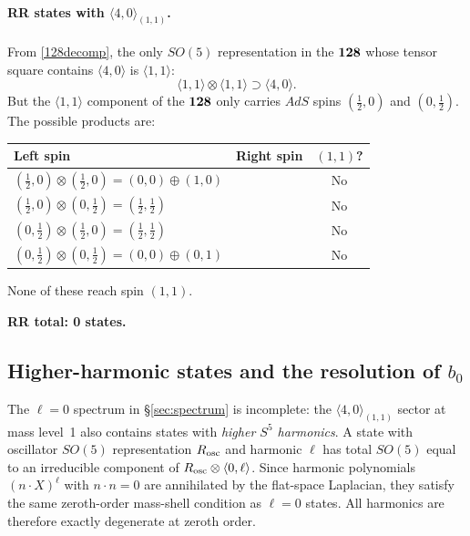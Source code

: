\documentclass[12pt]{article}
\def\be{\begin{equation}}
\def\ee{\end{equation}}
\begin{document}
\paragraph{RR states with $\langle 4,0\rangle_{(1,1)}$.}
From \eqref{128decomp}, the only $SO(5)$ representation in the ${\bf 128}$ whose tensor
square contains $\langle 4,0\rangle$ is $\langle 1,1\rangle$:
\be
\langle 1,1\rangle\otimes\langle 1,1\rangle\supset\langle 4,0\rangle.
\ee
But the $\langle 1,1\rangle$ component of the ${\bf 128}$ only carries $AdS$ spins
$(\tfrac12,0)$ and $(0,\tfrac12)$. The possible products are:

\smallskip
\begin{center}
\begin{tabular}{|l|l|c|}
\hline
Left spin & Right spin & $(1,1)$? \\
\hline
$(\tfrac12,0)\otimes(\tfrac12,0)=(0,0)\oplus(1,0)$ && No \\
$(\tfrac12,0)\otimes(0,\tfrac12)=(\tfrac12,\tfrac12)$ && No \\
$(0,\tfrac12)\otimes(\tfrac12,0)=(\tfrac12,\tfrac12)$ && No \\
$(0,\tfrac12)\otimes(0,\tfrac12)=(0,0)\oplus(0,1)$ && No \\
\hline
\end{tabular}
\end{center}
\smallskip

None of these reach spin $(1,1)$.

\smallskip
\noindent\textbf{RR total: 0 states.}

\subsection{Higher-harmonic states and the resolution of $b_0$}
\label{sec:b0resolution}

The $\ell=0$ spectrum in \S\ref{sec:spectrum} is incomplete: the $\langle 4,0\rangle_{(1,1)}$
sector at mass level~1 also contains states with \emph{higher $S^5$ harmonics}.
A state with oscillator $SO(5)$ representation $R_{\rm osc}$ and harmonic $\ell$ has total
$SO(5)$ equal to an irreducible component of $R_{\rm osc}\otimes\langle 0,\ell\rangle$.
Since harmonic polynomials $(n\cdot X)^\ell$ with $n\cdot n=0$ are annihilated by the
flat-space Laplacian, they satisfy the same zeroth-order mass-shell condition as $\ell=0$ states.
All harmonics are therefore exactly degenerate at zeroth order.
\end{document}
